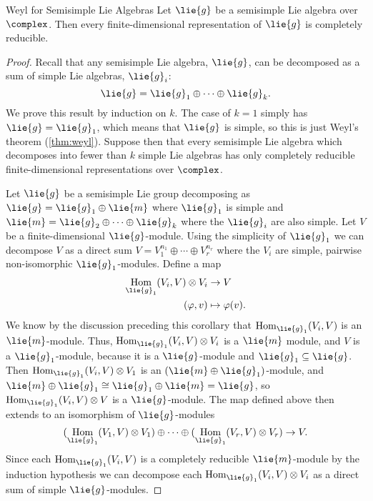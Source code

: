 \documentclass[fleqn]{NotesClass}
\DeclareMathOperator{\Hom}{Hom}
\newcommand{\isomorphic}{\cong}
\begin{document}
    \begin{crl}{Weyl for Semisimple Lie Algebras}{}
        Let \(\lie{g}\) be a semisimple Lie algebra over \(\complex\).
        Then every finite-dimensional representation of \(\lie{g}\) is completely reducible.
        \begin{proof}
            Recall that any semisimple Lie algebra, \(\lie{g}\), can be decomposed as a sum of simple Lie algebras, \(\lie{g}_i\):
            \begin{equation}
                \lie{g} = \lie{g}_1 \oplus \dotsb \oplus \lie{g}_k.
            \end{equation}
            We prove this result by induction on \(k\).
            The case of \(k = 1\) simply has \(\lie{g} = \lie{g}_1\), which means that \(\lie{g}\) is simple, so this is just Weyl's theorem (\cref{thm:weyl}).
            Suppose then that every semisimple Lie algebra which decomposes into fewer than \(k\) simple Lie algebras has only completely reducible finite-dimensional representations over \(\complex\).
            
            Let \(\lie{g}\) be a semisimple Lie group decomposing as \(\lie{g} = \lie{g}_1 \oplus \lie{m}\) where \(\lie{g}_1\) is simple and \(\lie{m} = \lie{g}_2 \oplus \dotsb \oplus \lie{g}_k\) where the \(\lie{g}_i\) are also simple.
            Let \(V\) be a finite-dimensional \(\lie{g}\)-module.
            Using the simplicity of \(\lie{g}_1\) we can decompose \(V\) as a direct sum \(V = V_1^{n_1} \oplus \dotsb \oplus V_r^{n_r}\) where the \(V_i\) are simple, pairwise non-isomorphic \(\lie{g}_1\)-modules.
            Define a map
            \begin{align}
                \Hom_{\lie{g}_1}(V_i, V) \otimes V_i &\to V\\
                (\varphi, v) &\mapsto \varphi(v).
            \end{align}
            We know by the discussion preceding this corollary that \(\Hom_{\lie{g}_1}(V_i, V)\) is an \(\lie{m}\)-module.
            Thus, \(\Hom_{\lie{g}_1}(V_i, V) \otimes V_i\) is a \(\lie{m}\) module, and \(V\) is a \(\lie{g}_1\)-module, because it is a \(\lie{g}\)-module and \(\lie{g}_1 \subseteq \lie{g}\).
            Then \(\Hom_{\lie{g}_1}(V_i, V) \otimes V_1\) is an \((\lie{m} \oplus \lie{g}_1)\)-module, and \(\lie{m} \oplus \lie{g}_1 \isomorphic \lie{g}_1 \oplus \lie{m} = \lie{g}\), so \(\Hom_{\lie{g}_1}(V_i, V) \otimes V\) is a \(\lie{g}\)-module.
            The map defined above then extends to an isomorphism of \(\lie{g}\)-modules
            \begin{equation}
                (\Hom_{\lie{g}_1}(V_1, V) \otimes V_1) \oplus \dotsb \oplus (\Hom_{\lie{g}_1}(V_r, V) \otimes V_r) \to V.
            \end{equation}
            Since each \(\Hom_{\lie{g}_1}(V_i, V)\) is a completely reducible \(\lie{m}\)-module by the induction hypothesis we can decompose each \(\Hom_{\lie{g}_1}(V_i, V) \otimes V_i\) as a direct sum of simple \(\lie{g}\)-modules.
        \end{proof}
    \end{crl}
    
    
    
    
%	
	
	\backmatter
	\renewcommand{\glossaryname}{Acronyms}
	\printglossary[acronym]
	\printindex
\end{document}
